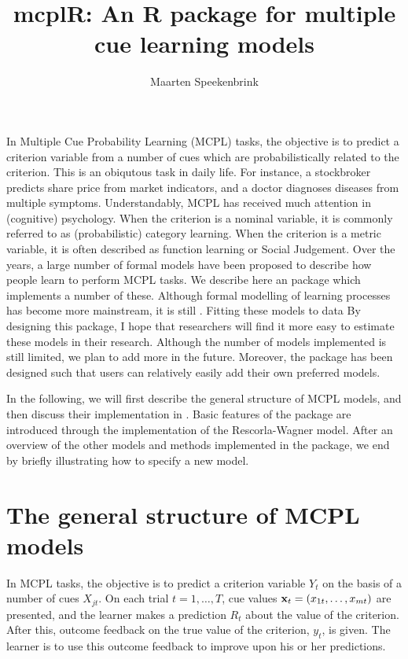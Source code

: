 \documentclass[doc]{apa}
\title{mcplR: An R package for multiple cue learning models}
\author{Maarten Speekenbrink}
\affiliation{Department of Cognitive, Perceptual and Brain Sciences \\ University College London}
\renewcommand{\vec}[1]{\text{\bf{#1}}}
\newcommand{\code}[1]{{\ttfamily{#1}}}
\begin{document}
\maketitle

In Multiple Cue Probability Learning (MCPL) tasks, the objective is to predict a criterion variable from a number of cues which are probabilistically related to the criterion. This is an obiqutous task in daily life. For instance, a stockbroker predicts share price from market indicators, and a doctor diagnoses diseases from multiple symptoms. Understandably, MCPL has received much attention in (cognitive) psychology. When the criterion is a nominal variable, it is commonly referred to as (probabilistic) category learning. When the criterion is a metric variable, it is often described as function learning or Social Judgement. Over the years, a large number of formal models have been proposed to describe how people learn to perform MCPL tasks. We describe here an \code{R} package which implements a number of these. Although formal modelling of learning processes has become more mainstream, it is still . Fitting these models to data By designing this package, I hope that researchers will find it more easy to estimate these models in their research. Although the number of models implemented is still limited, we plan to add more in the future. Moreover, the package has been designed such that users can relatively easily add their own preferred models. 

In the following, we will first describe the general structure of MCPL models, and then discuss their implementation in \code{mcplR}. Basic features of the package are introduced through the implementation of the Rescorla-Wagner model. After an overview of the other models and methods implemented in the package, we end by briefly illustrating how to specify a new model. 

\section{The general structure of MCPL models}

In MCPL tasks, the objective is to predict a criterion variable $Y_t$ on the basis of a number of cues $X_{jt}$. On each trial $t = 1,\ldots,T$, cue values $\vec{x}_t = (x_{1t},\ldots,x_{mt})$ are presented, and the learner makes a prediction $R_t$ about the value of the criterion. After this, outcome feedback on the true value of the criterion, $y_t$, is given. The learner is to use this outcome feedback to improve upon his or her predictions.
\end{document}
